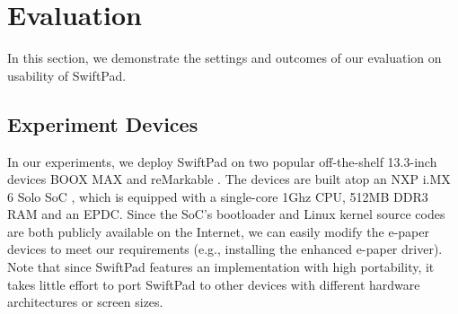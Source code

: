 \documentclass[]{sigchi}
\begin{document}
\section{Evaluation}\label{sect:eve}
In this section, we demonstrate the settings and outcomes of our evaluation on usability of SwiftPad. 

\subsection{Experiment Devices}
In our experiments, we deploy SwiftPad on two popular off-the-shelf 13.3-inch devices BOOX MAX \cite{onyxboox} and reMarkable \cite{reMarkable}. 
The devices are built atop an NXP i.MX 6 Solo SoC \cite{nxpsoc}, which is equipped with a single-core 1Ghz CPU, 512MB DDR3 RAM and an EPDC. Since the SoC's bootloader and Linux kernel source codes are both publicly available on the Internet, we can easily modify the e-paper devices to meet our requirements (e.g., installing the enhanced e-paper driver). 
Note that since SwiftPad features an implementation with high portability, it takes little effort to port SwiftPad to other devices with different hardware architectures or screen sizes. 


\end{document}
